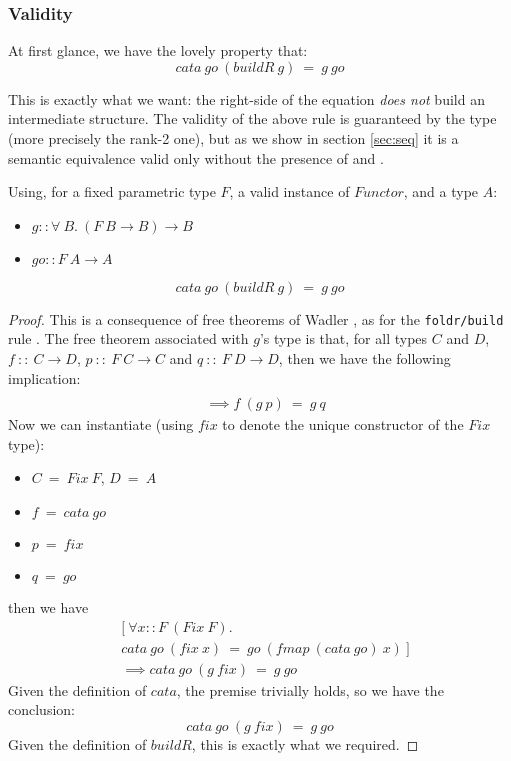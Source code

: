 \subsubsection{Validity}
At first glance, we have the lovely property that:
$$cata\ go\ (buildR\ g)\ =\ g\ go$$

This is exactly what we want: the right-side of the equation \emph{does not} build an intermediate structure. The validity of the above rule is guaranteed by the type (more precisely the rank-2 one), but as we show in section \ref{sec:seq} it is a semantic equivalence valid only without the presence of  and .

\begin{theorem}
Using, for a fixed parametric type $F$, a valid instance of $Functor$, and a type $A$:
\begin{itemize}
	\item $g :: \forall\ B.\ (F\ B \to B) \to B$
	\item $go :: F\ A \to A $
\end{itemize}
$$cata\ go\ (buildR\ g)\ =\ g\ go$$
\end{theorem}
\begin{proof}
This is a consequence of free theorems of Wadler \cite{Wadler:1989:TF:99370.99404}, as for the \verb|foldr/build| rule \cite{Gill:1993:SCD:165180.165214}. The free theorem associated with $g$'s type is that, for all types $C$ and $D$, $f\ ::\ C \to D$, $p\ ::\ F\ C \to C$ and $q\ ::\ F\ D \to D$, then we have the following implication:
\begin{align*}
[\ \forall& x::C.\ f\ (p\ x)\ =\ q\ (fmap\ f\ x)\ ]\\
&\implies f\ (g\ p)\ =\ g\ q
\end{align*}
Now we can instantiate (using $fix$ to denote the unique constructor of the $Fix$ type):
\begin{itemize}
	\item $C\ =\ Fix\ F$, $D\ =\ A$
	\item $f\ =\ cata\ go$
	\item $p\ =\ fix$
	\item $q\ =\ go$
\end{itemize}
then we have
\begin{align*}
&[\ \forall x::F\ (Fix\ F).\\
&cata\ go\ (fix\ x)\ =\ go\ (fmap\ (cata\ go)\ x)\ ]\\
&\implies cata\ go\ (g\ fix)\ =\ g\ go
\end{align*}
Given the definition of $cata$, the premise trivially holds, so we have the conclusion:
$$cata\ go\ (g\ fix)\ =\ g\ go$$
Given the definition of $buildR$, this is exactly what we required.
\end{proof}

